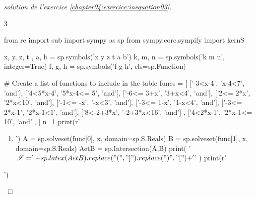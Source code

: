\documentclass[main.tex]{subfiles}
\begin{document}
\vspace{-1em}
\begin{proof} [solution de l'exercice  \ref{chapter04:exercice:inequation03}]\hfill
	\vspace{-0.75em}
\begin{multicols}{3} 
\begin{pycode} 
from re import sub
import sympy as sp
from sympy.core.sympify import kernS

x, y, z, t , a, b = sp.symbols('x y z t a b')
k, m, n = sp.symbols('k m n', integer=True)
f, g, h = sp.symbols('f g h', cls=sp.Function)

# Create a list of functions to include in the table
funcs = [ 
['-3<x-4', 'x-4<7', 'and'],
['4<5*x-4', '5*x-4<= 5', 'and'],
['-6<= 3+x', '3+x<4', 'and'],
['2<= 2*x', '2*x<10', 'and'],
['-1<= -x', '-x<3', 'and'],
['-3<= 1-x', '1-x<4', 'and'],
['-3<= 2*x-1', '2*x-1<1', 'and'],
['8<-2+3*x', '-2+3*x<16', 'and'] ,
['4<2*x-1', '2*x-1<= 10', 'and'], 
]
n=1
print(r'\begin{enumerate}[label={$(I_{\arabic*})$}] ')
for func in funcs:
	print('\item ')
	A = sp.solveset(func[0],   x,   domain=sp.S.Reals)
	B = sp.solveset(func[1],   x,   domain=sp.S.Reals)
	AetB = sp.Intersection(A,B)
	print( '$\mathscr{S} =' + sp.latex(AetB).replace("(", "]").replace(")", "[")   + '$'     )
print(r'\end{enumerate} ')
\end{pycode}
\end{multicols}	
\scriptsize
\end{proof} 
\vspace{-1em}
\end{document}
